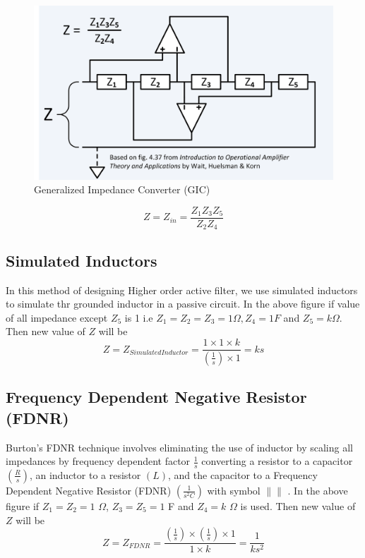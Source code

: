 \documentclass[a4paper,11pt]{article}
\newcommand\ddfrac[2]{\frac{\displaystyle #1}{\displaystyle #2}}
\begin{document}
\begin{figure}[H]
    \centering
    \includegraphics[width=\linewidth]{./FIG/GIC.png}
    \caption{Generalized Impedance Converter (GIC)}
\end{figure}

\begin{equation}
    Z=Z_{in}=\frac{Z_1Z_3Z_5}{Z_2Z_4}
\end{equation}




\subsection{Simulated Inductors}
In this method of designing Higher order active filter, we use simulated inductors to simulate thr grounded inductor in a passive circuit. In the above figure if value of all impedance except $Z_5$  is 1 i.e $Z_1=Z_2=Z_3=1 \Omega, Z_4= 1 F$ and $Z_5=k\Omega$. Then new value of $Z$ will be
\begin{equation*}
    Z=Z_{Simulated Inductor}=\ddfrac{1\times1\times k}{\left(\frac{1}{s}\right)\times1}=ks
\end{equation*}



\subsection{Frequency Dependent Negative Resistor (FDNR)}
Burton’s FDNR technique involves eliminating the use of inductor by scaling all impedances by frequency dependent factor $\frac{1}{s}$ converting a resistor to a capacitor $\left(\ddfrac{R}{s}\right)$, an inductor to a resistor $(L)$, and the capacitor to a Frequency Dependent Negative Resistor (FDNR) $\left(\ddfrac{1}{s^2C}\right)$ with symbol  $\|\|$ .
In the above figure if $Z_1=Z_2=1$ $\Omega$, $Z_3=Z_5=1$ F and $Z_4=k$ $\Omega$ is used. Then new value of $Z$ will be
\begin{equation*}
    Z=Z_{FDNR}=\ddfrac{\left(\frac{1}{s}\right)\times\left(\frac{1}{s}\right)\times 1}{1\times k}=\frac{1}{ks^2}
\end{equation*}
\end{document}
